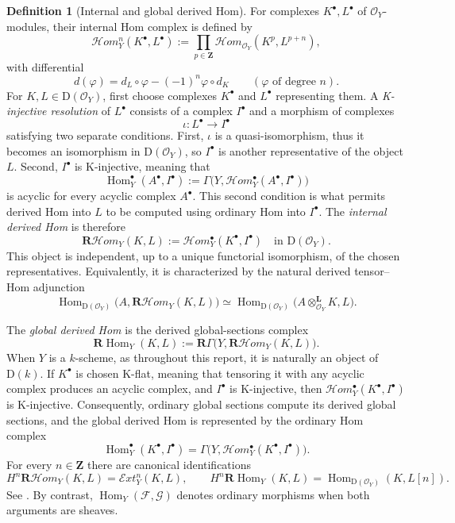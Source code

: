 \documentclass[11pt,a4paper]{article}
\theoremstyle{definition}
\newtheorem{definition}[theorem]{Definition}
\theoremstyle{remark}
\newcommand{\OO}{\mathcal O}
\newcommand{\FF}{\mathcal F}
\newcommand{\GG}{\mathcal G}
\newcommand{\Hom}{\operatorname{Hom}}
\newcommand{\shHom}{\mathcal H\!om}
\newcommand{\shExt}{\mathcal E\!xt}
\newcommand{\RHom}{\mathbf R\!\operatorname{Hom}}
\newcommand{\RshHom}{\mathbf R\!\mathcal H\!om}
\newcommand{\RGamma}{\mathbf R\Gamma}
\newcommand{\D}{\mathrm D}
\begin{document}
\begin{definition}[Internal and global derived Hom]
\label{def:derived-hom}
For complexes $K^\bullet,L^\bullet$ of $\OO_Y$-modules, their internal Hom
complex is defined by
\[
  \shHom_Y^n(K^\bullet,L^\bullet)
  :=\prod_{p\in\mathbf Z}\shHom_{\OO_Y}(K^p,L^{p+n}),
\]
with differential
\[
  d(\varphi)=d_L\circ\varphi-(-1)^n\varphi\circ d_K
  \qquad(\varphi\text{ of degree }n).
\]
For $K,L\in\D(\OO_Y)$, first choose complexes $K^\bullet$ and $L^\bullet$
representing them. A \emph{K-injective resolution} of $L^\bullet$ consists
of a complex $I^\bullet$ and a morphism of complexes
\[
  \iota:L^\bullet\longrightarrow I^\bullet
\]
satisfying two separate conditions. First, $\iota$ is a quasi-isomorphism, thus it becomes an isomorphism in $\D(\OO_Y)$, so $I^\bullet$ is another representative of the object $L$.
Second, $I^\bullet$ is K-injective, meaning that
\[
  \Hom_Y^\bullet(A^\bullet,I^\bullet)
  :=\Gamma\bigl(Y,\shHom_Y^\bullet(A^\bullet,I^\bullet)\bigr)
\]
is acyclic for every acyclic complex $A^\bullet$. This second condition is
what permits derived Hom into $L$ to be computed using ordinary Hom into
$I^\bullet$. The \emph{internal derived Hom} is therefore
\[
  \RshHom_Y(K,L):=\shHom_Y^\bullet(K^\bullet,I^\bullet)
  \quad\text{in }\D(\OO_Y).
\]
This object is independent, up to a unique functorial isomorphism, of the
chosen representatives. Equivalently, it is characterized by the natural
derived tensor--Hom adjunction
\[
  \Hom_{\D(\OO_Y)}
    \bigl(A,\RshHom_Y(K,L)\bigr)
  \simeq
  \Hom_{\D(\OO_Y)}
    \bigl(A\otimes_{\OO_Y}^{\mathbf L}K,L\bigr).
\]

The \emph{global derived Hom} is the derived global-sections complex
\[
  \RHom_Y(K,L)
  :=\RGamma\bigl(Y,\RshHom_Y(K,L)\bigr).
\]
When $Y$ is a $k$-scheme, as throughout this report, it is naturally an
object of $\D(k)$. If $K^\bullet$ is chosen K-flat, meaning that tensoring it
with any acyclic complex produces an acyclic complex, and $I^\bullet$ is
K-injective, then $\shHom_Y^\bullet(K^\bullet,I^\bullet)$ is K-injective.
Consequently, ordinary global sections compute its derived global sections,
and the global derived Hom is represented by the ordinary Hom complex
\[
  \Hom_Y^\bullet(K^\bullet,I^\bullet)
  =\Gamma\bigl(Y,\shHom_Y^\bullet(K^\bullet,I^\bullet)\bigr).
\]
For every $n\in\mathbf Z$ there are canonical identifications
\[
  H^n\RshHom_Y(K,L)=\shExt_Y^n(K,L),
  \qquad
  H^n\RHom_Y(K,L)
  =\Hom_{\D(\OO_Y)}(K,L[n]).
\]
See \cite[Tags 08DH and 0B6A]{Stacks}. By contrast,
$\Hom_Y(\FF,\GG)$ denotes ordinary morphisms when both arguments are sheaves.
\end{definition}
\end{document}
